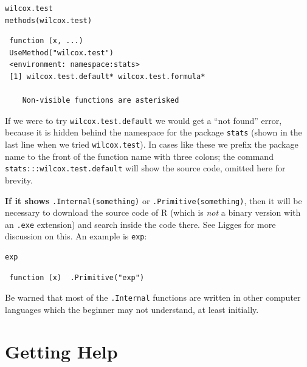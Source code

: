 \documentclass[captions=tableheading]{scrbook}
\begin{document}
\begin{verbatim}
wilcox.test
methods(wilcox.test)
\end{verbatim}

\begin{verbatim}
 function (x, ...) 
 UseMethod("wilcox.test")
 <environment: namespace:stats>
 [1] wilcox.test.default* wilcox.test.formula*
 
    Non-visible functions are asterisked
\end{verbatim}

If we were to try \texttt{wilcox.test.default}  we would get a ``not found'' error, because it is hidden behind the namespace for the package \texttt{stats} (shown in the last line when we tried \texttt{wilcox.test}). In cases like these we prefix the package name to the front of the function name with three colons; the command \texttt{stats:::wilcox.test.default} will show the source code, omitted here for brevity.

\textbf{If it shows} \texttt{.Internal(something)} or \texttt{.Primitive(something)}, then it will be necessary to download the source code of \textsf{R} (which is \emph{not} a binary version with an \texttt{.exe} extension) and search inside the code there. See Ligges \cite{Ligges2006} for more discussion on this. An example is \texttt{exp}:


\begin{verbatim}
exp
\end{verbatim}

\begin{verbatim}
 function (x)  .Primitive("exp")
\end{verbatim}

Be warned that most of the \texttt{.Internal} functions are written in other computer languages which the beginner may not understand, at least initially.
\section{Getting Help}
\label{sec-2-4}

\label{sec:Getting-Help}
\end{document}
